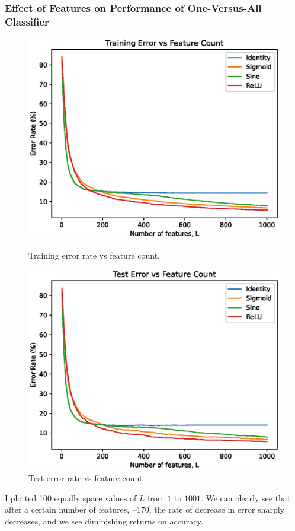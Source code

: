 \documentclass{article}
\begin{document}
\subsubsection{Effect of Features on Performance of One-Versus-All Classifier}
\begin{figure}[h!]
    \centering
    \begin{minipage}{0.5\textwidth}
        \centering
        \includegraphics[width=\textwidth]{images/one_vs_all_training_error_vs_features.eps}
        \caption{Training error rate vs feature count.}
    \end{minipage}\hfill
    \begin{minipage}{0.5\textwidth}
        \centering
        \includegraphics[width=\textwidth]{images/one_vs_all_test_error_vs_features.eps}
        \caption{Test error rate vs feature count}
    \end{minipage}
\end{figure}
I plotted 100 equally space values of $L$ from $1$ to $1001$.
We can clearly see that after a certain number of features, \textasciitilde170, the rate of decrease in error sharply decreases, and we see diminishing returns on accuracy.
\end{document}
